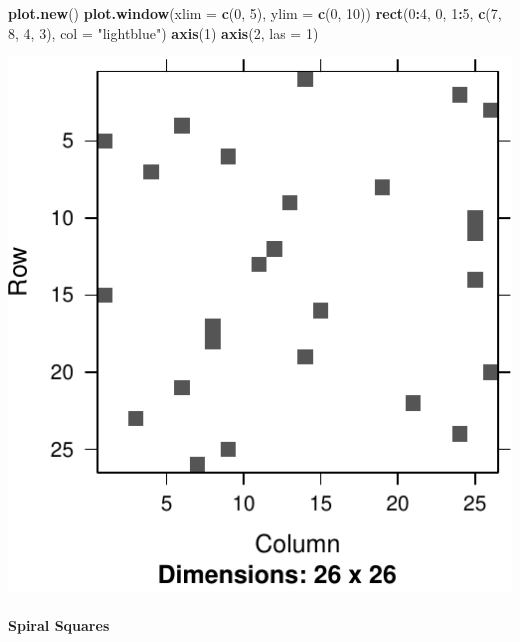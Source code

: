\documentclass[]{book}
\newenvironment{Shaded}{\begin{snugshade}}{\end{snugshade}}
\newcommand{\DataTypeTok}[1]{\textcolor[rgb]{0.13,0.29,0.53}{#1}}
\newcommand{\DecValTok}[1]{\textcolor[rgb]{0.00,0.00,0.81}{#1}}
\newcommand{\KeywordTok}[1]{\textcolor[rgb]{0.13,0.29,0.53}{\textbf{#1}}}
\newcommand{\NormalTok}[1]{#1}
\newcommand{\OperatorTok}[1]{\textcolor[rgb]{0.81,0.36,0.00}{\textbf{#1}}}
\newcommand{\StringTok}[1]{\textcolor[rgb]{0.31,0.60,0.02}{#1}}
\let\oldparagraph\paragraph
\renewcommand{\paragraph}[1]{\oldparagraph{#1}\mbox{}}
\theoremstyle{definition}
\theoremstyle{definition}
\theoremstyle{definition}
\theoremstyle{remark}
\begin{document}
\begin{Shaded}
\begin{Highlighting}[]
\KeywordTok{plot.new}\NormalTok{()}
\KeywordTok{plot.window}\NormalTok{(}\DataTypeTok{xlim =} \KeywordTok{c}\NormalTok{(}\DecValTok{0}\NormalTok{, }\DecValTok{5}\NormalTok{), }\DataTypeTok{ylim =} \KeywordTok{c}\NormalTok{(}\DecValTok{0}\NormalTok{, }\DecValTok{10}\NormalTok{))}
\KeywordTok{rect}\NormalTok{(}\DecValTok{0}\OperatorTok{:}\DecValTok{4}\NormalTok{, }\DecValTok{0}\NormalTok{, }\DecValTok{1}\OperatorTok{:}\DecValTok{5}\NormalTok{, }\KeywordTok{c}\NormalTok{(}\DecValTok{7}\NormalTok{, }\DecValTok{8}\NormalTok{, }\DecValTok{4}\NormalTok{, }\DecValTok{3}\NormalTok{), }\DataTypeTok{col =} \StringTok{"lightblue"}\NormalTok{)}
\KeywordTok{axis}\NormalTok{(}\DecValTok{1}\NormalTok{)}
\KeywordTok{axis}\NormalTok{(}\DecValTok{2}\NormalTok{, }\DataTypeTok{las =} \DecValTok{1}\NormalTok{)}
\end{Highlighting}
\end{Shaded}

\includegraphics[width=0.5\linewidth]{Rcourse_files/figure-latex/unnamed-chunk-281-1}

\hypertarget{spiral-squares}{%
\paragraph{Spiral Squares}\label{spiral-squares}}
\end{document}
